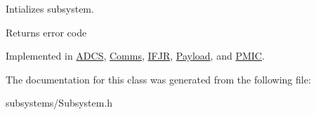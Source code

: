 Intializes subsystem. 

\begin{DoxyReturn}{Returns}
error code 
\end{DoxyReturn}


Implemented in \mbox{\hyperlink{class_a_d_c_s_a5a4196a5298a2e804ee85f2965b31133}{A\+D\+CS}}, \mbox{\hyperlink{class_comms_adf638922e6c53bef0fab4f482775f072}{Comms}}, \mbox{\hyperlink{class_i_f_j_r_a0a7d913d00e8573b613b980f17ed2fd4}{I\+F\+JR}}, \mbox{\hyperlink{class_payload_aa55a2da734e6950391d73b0837bbd3b9}{Payload}}, and \mbox{\hyperlink{class_p_m_i_c_ae899cdd3d66ecef345c748f9c42b5399}{P\+M\+IC}}.



The documentation for this class was generated from the following file\+:\begin{DoxyCompactItemize}
\item 
subsystems/Subsystem.\+h\end{DoxyCompactItemize}
